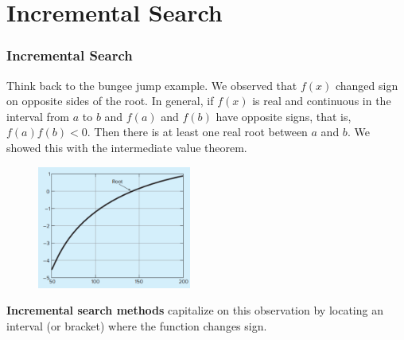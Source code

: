\documentclass{if-beamer}
\begin{document}
\section{Incremental Search}
\begin{frame}
\frametitle{Incremental Search}
Think back to the bungee jump example. We observed that $f(x)$ changed sign on opposite sides of the root. In general, if $f(x)$ is real and continuous in the interval from $a$ to $b$ and $f(a)$ and $f(b)$ have opposite signs, that is,$f(a)f(b)<0$. Then there is at least one real root between $a$ and $b$. We showed this with the intermediate value theorem.
\\\vspace{0.25cm}
\begin{figure}
	\centering
	\includegraphics[width = 0.45\textwidth]{figures/BunjeeJumpGraph}
\end{figure}
\textbf{Incremental search methods} capitalize on this observation by locating an interval (or bracket) where the function changes sign.
\end{frame}
\end{document}
